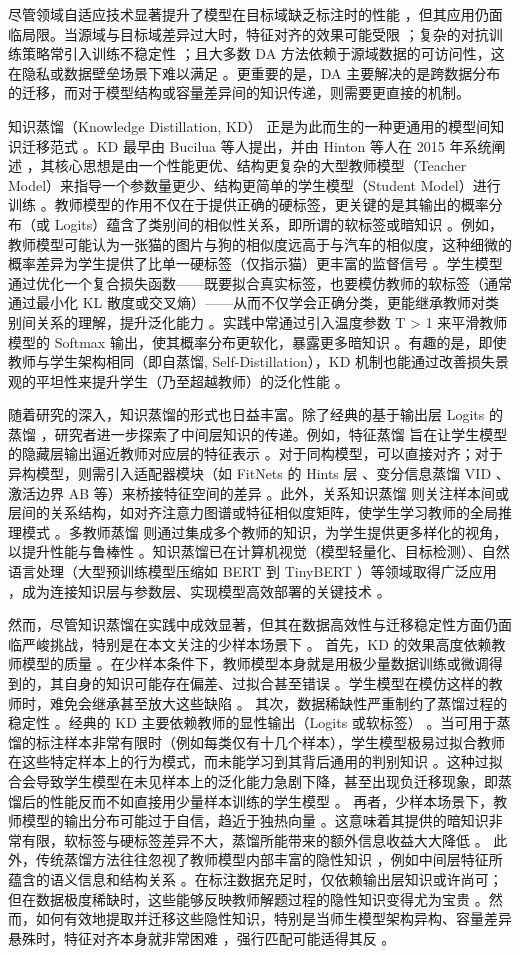 \documentclass[../main.tex]{subfiles}
\begin{document}
尽管领域自适应技术显著提升了模型在目标域缺乏标注时的性能 ，但其应用仍面临局限。当源域与目标域差异过大时，特征对齐的效果可能受限 ；复杂的对抗训练策略常引入训练不稳定性 ；且大多数 DA 方法依赖于源域数据的可访问性，这在隐私或数据壁垒场景下难以满足 。更重要的是，DA 主要解决的是跨数据分布的迁移，而对于模型结构或容量差异间的知识传递，则需要更直接的机制。

知识蒸馏（Knowledge Distillation, KD） 正是为此而生的一种更通用的模型间知识迁移范式 。KD 最早由 Bucilua 等人提出，并由 Hinton 等人在 2015 年系统阐述 ，其核心思想是由一个性能更优、结构更复杂的大型教师模型（Teacher Model）来指导一个参数量更少、结构更简单的学生模型（Student Model）进行训练 。教师模型的作用不仅在于提供正确的硬标签，更关键的是其输出的概率分布（或 Logits）蕴含了类别间的相似性关系，即所谓的软标签或暗知识 。例如，教师模型可能认为一张猫的图片与狗的相似度远高于与汽车的相似度，这种细微的概率差异为学生提供了比单一硬标签（仅指示猫）更丰富的监督信号 。学生模型通过优化一个复合损失函数——既要拟合真实标签，也要模仿教师的软标签（通常通过最小化 KL 散度或交叉熵）——从而不仅学会正确分类，更能继承教师对类别间关系的理解，提升泛化能力 。实践中常通过引入温度参数 T > 1 来平滑教师模型的 Softmax 输出，使其概率分布更软化，暴露更多暗知识 。有趣的是，即使教师与学生架构相同（即自蒸馏, Self-Distillation），KD 机制也能通过改善损失景观的平坦性来提升学生（乃至超越教师）的泛化性能 。

随着研究的深入，知识蒸馏的形式也日益丰富。除了经典的基于输出层 Logits 的蒸馏 ，研究者进一步探索了中间层知识的传递。例如，特征蒸馏 旨在让学生模型的隐藏层输出逼近教师对应层的特征表示 。对于同构模型，可以直接对齐；对于异构模型，则需引入适配器模块（如 FitNets 的 Hints 层 、变分信息蒸馏 VID 、激活边界 AB 等）来桥接特征空间的差异 。此外，关系知识蒸馏 则关注样本间或层间的关系结构，如对齐注意力图谱或特征相似度矩阵，使学生学习教师的全局推理模式 。多教师蒸馏 则通过集成多个教师的知识，为学生提供更多样化的视角，以提升性能与鲁棒性 。知识蒸馏已在计算机视觉（模型轻量化、目标检测）、自然语言处理（大型预训练模型压缩如 BERT 到 TinyBERT ）等领域取得广泛应用 ，成为连接知识层与参数层、实现模型高效部署的关键技术 。

然而，尽管知识蒸馏在实践中成效显著，但其在数据高效性与迁移稳定性方面仍面临严峻挑战，特别是在本文关注的少样本场景下 。 首先，KD 的效果高度依赖教师模型的质量 。在少样本条件下，教师模型本身就是用极少量数据训练或微调得到的，其自身的知识可能存在偏差、过拟合甚至错误 。学生模型在模仿这样的教师时，难免会继承甚至放大这些缺陷 。 其次，数据稀缺性严重制约了蒸馏过程的稳定性 。经典的 KD 主要依赖教师的显性输出（Logits 或软标签） 。当可用于蒸馏的标注样本非常有限时（例如每类仅有十几个样本），学生模型极易过拟合教师在这些特定样本上的行为模式，而未能学习到其背后通用的判别知识 。这种过拟合会导致学生模型在未见样本上的泛化能力急剧下降，甚至出现负迁移现象，即蒸馏后的性能反而不如直接用少量样本训练的学生模型 。 再者，少样本场景下，教师模型的输出分布可能过于自信，趋近于独热向量 。这意味着其提供的暗知识非常有限，软标签与硬标签差异不大，蒸馏所能带来的额外信息收益大大降低 。 此外，传统蒸馏方法往往忽视了教师模型内部丰富的隐性知识 ，例如中间层特征所蕴含的语义信息和结构关系 。在标注数据充足时，仅依赖输出层知识或许尚可；但在数据极度稀缺时，这些能够反映教师解题过程的隐性知识变得尤为宝贵 。然而，如何有效地提取并迁移这些隐性知识，特别是当师生模型架构异构、容量差异悬殊时，特征对齐本身就非常困难 ，强行匹配可能适得其反 。
\end{document}
